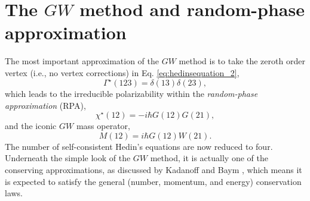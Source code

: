 \documentclass[11pt, oneside]{article}          %
\begin{document}
\section{The $GW$ method and random-phase approximation}
\label{sec:gw-method-random}

The most important approximation of the $GW$ method is to take the zeroth order vertex (i.e., no vertex corrections) in Eq. \eqref{eq:hedinsequation_2},
\begin{equation}
  \label{eq:GW_vertex}
  \Gamma^{\star}(123) = \delta(13) \delta(23),
\end{equation}
which leads to the irreducible polarizability within the \emph{random-phase approximation} (RPA),
\begin{equation}
  \label{eq:GW_chi}
  \chi^{\star}(12) = -i \hbar G(12) G(21),
\end{equation}
and the iconic $GW$ mass operator,
\begin{equation}
  \label{eq:GW_Sigma}
  M(12) = i \hbar G(12) W(21).
\end{equation}
The number of self-consistent Hedin's equations are now reduced to four. Underneath the simple look of the $GW$ method, it is actually one of the conserving approximations, as discussed by Kadanoff and Baym \cite{baym1961conservation, baym1962selfconsistent}, which means it is expected to satisfy the general (number, momentum, and energy) conservation laws.
\end{document}
